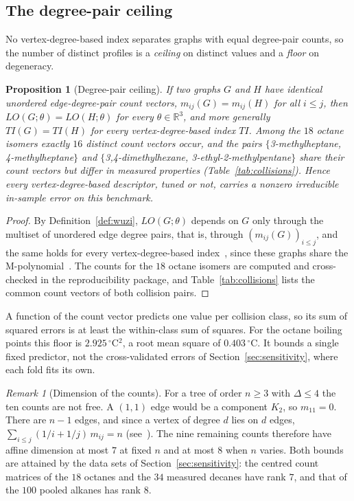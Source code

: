 \documentclass[a5paper, 10pt]{article}
\theoremstyle{plain}
\newtheorem{proposition}[theorem]{Proposition}
\theoremstyle{remark}
\newtheorem*{remark}{Remark}
\theoremstyle{definition}
\begin{document}
\subsection{The degree-pair ceiling}\label{sec:ceiling}

No vertex-degree-based index separates graphs with equal degree-pair
counts, so the number of distinct profiles is a \emph{ceiling} on
distinct values and a \emph{floor} on degeneracy.

  \begin{proposition}[Degree-pair ceiling]\label{prop:collision}
  If two graphs $G$ and $H$ have identical unordered
  edge-degree-pair count vectors, $m_{ij}(G) = m_{ij}(H)$ for all
  $i \le j$, then $LO(G;\theta) = LO(H;\theta)$ for every
  $\theta \in \mathbb{R}^3$, and more generally
  $TI(G) = TI(H)$ for every vertex-degree-based index $TI$. Among the
  $18$ octane isomers exactly $16$ distinct count vectors occur, and the
  pairs $\{$3-methylheptane, 4-methylheptane$\}$ and
  $\{$3,4-dimethylhexane, 3-ethyl-2-methylpentane$\}$ share their
  count vectors but differ in measured properties
  (Table~\ref{tab:collisions}). Hence every vertex-degree-based
  descriptor, tuned or not, carries a nonzero irreducible in-sample error on this benchmark.
  \end{proposition}

  \begin{proof}
  By Definition~\ref{def:wuzi}, $LO(G;\theta)$ depends on $G$ only
  through the multiset of unordered edge degree pairs, that is, through
  $(m_{ij}(G))_{i \le j}$, and the same holds for every vertex-degree-based
  index~\cite{Rada2026LinearVDB}, since these graphs share the M-polynomial~\cite{DeutschKlavzar2015}. The counts for the $18$ octane
  isomers are computed and cross-checked in the reproducibility
  package, and Table~\ref{tab:collisions} lists the common count
  vectors of both collision pairs.
  \end{proof}

  A function of the count vector predicts one value per collision
  class, so its sum of squared errors is at least the within-class sum
  of squares. For the octane boiling points this floor is
  $2.925\,^{\circ}$C$^2$, a root mean square of $0.403\,^{\circ}$C. It
  bounds a single fixed predictor, not the cross-validated errors of
  Section~\ref{sec:sensitivity}, where each fold fits its own.

  \begin{remark}[Dimension of the counts]\label{rem:countdim}
  For a tree of order $n \ge 3$ with $\Delta \le 4$ the ten counts are
  not free. A $(1,1)$ edge would be a component $K_2$, so $m_{11} = 0$.
  There are $n - 1$ edges, and since a vertex of degree $d$ lies on $d$
  edges, $\sum_{i \le j} (1/i + 1/j)\,m_{ij} = n$ (see~\cite[eqs.~(3)--(4)]{CruzRada2019PathStar}). The nine remaining
  counts therefore have affine dimension at most $7$ at fixed $n$ and
  at most $8$ when $n$ varies. Both bounds are attained by the data
  sets of Section~\ref{sec:sensitivity}: the centred count matrices of
  the $18$ octanes and the $34$ measured decanes have rank $7$, and that
  of the $100$ pooled alkanes has rank $8$.
  \end{remark}
\end{document}
